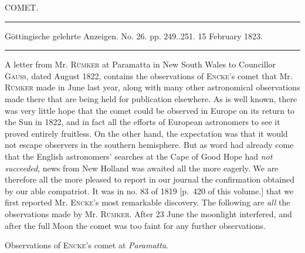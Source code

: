 \clearpage
{}
\begin{center}
{\large COMET.}

\noindent\rule{\linewidth}{0.4pt}

Göttingische gelehrte Anzeigen. No. 26. pp. 249..251. 15 February 1823.

\noindent\rule{\linewidth}{0.4pt}
\end{center}

A letter from Mr. \textsc{Rümker} at Paramatta in New South Wales to Councillor \textsc{Gauss}, dated August 1822, contains the observations of \textsc{Encke}’s comet that Mr. \textsc{Rümker} made in June last year, along with many other astronomical observations made there that are being held for publication elsewhere. As is well known, there was very little hope that the comet could be observed in Europe on its return to the Sun in 1822, and in fact all the efforts of European astronomers to see it proved entirely fruitless. On the other hand, the expectation was that it would not escape observers in the southern hemisphere. But as word had already come that the English astronomers’ searches at the Cape of Good Hope had \emph{not succeeded}, news from New Holland was awaited all the more eagerly. We are therefore all the more pleased to report in our journal the confirmation obtained by our able compatriot. It was in no. 83 of 1819 [p.~420 of this volume.] that we first reported Mr. \textsc{Encke}’s most remarkable discovery. The following are \emph{all} the observations made by Mr. \textsc{Rümker}. After 23 June the moonlight interfered, and after the full Moon the comet was too faint for any further observations.

\begin{center}
Observations of \textsc{Encke}’s comet at \emph{Paramatta}.
\end{center}

